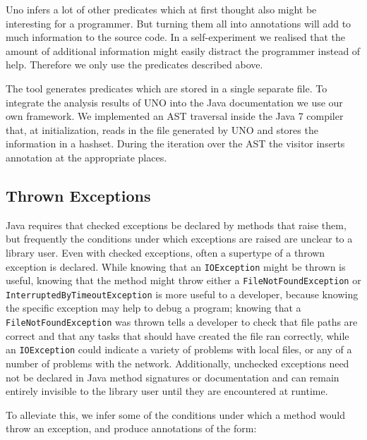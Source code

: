 
Uno infers a lot of other predicates which at first thought also might be 
interesting for a programmer. But turning them all into annotations will
add to much information to the source code. In a self-experiment we 
realised that the amount of additional information might easily distract
the programmer instead of help. Therefore we only use the predicates 
described above.

The tool generates predicates which are stored in a single separate file. 
To integrate the analysis results of UNO into the Java documentation we
use our own framework. We implemented an AST traversal inside the Java 7 
compiler that, at initialization, reads in the file generated by UNO and 
stores the information in a hashset. During the iteration over the AST
the visitor inserts annotation at the appropriate places.

\subsection{Thrown Exceptions}

Java requires that checked exceptions be declared by methods that raise them,
but frequently the conditions under which exceptions are raised are unclear to a
library user. Even with checked exceptions, often a supertype of a thrown
exception is declared.  While knowing that an \texttt{IOException} might be
thrown is useful, knowing that the method might throw either a
\texttt{FileNotFoundException} or \texttt{InterruptedByTimeoutException} is more
useful to a developer, because knowing the specific exception may help to debug
a program; knowing that a \texttt{FileNotFoundException} was thrown tells a
developer to check that file paths are correct and that any tasks that should
have created the file ran correctly, while an \texttt{IOException} could
indicate a variety of problems with local files, or any of a number of problems
with the network.  Additionally, unchecked exceptions need not be declared in Java method
signatures or documentation and can remain entirely invisible to the library
user until they are encountered at runtime.

To alleviate this, we infer some of the conditions under which a method would
throw an exception, and produce annotations of the form:

